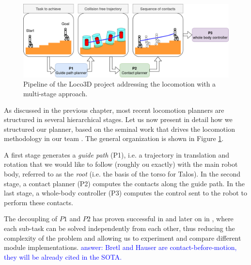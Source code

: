\begin{figure}
    \centering
    \includegraphics[width=\textwidth]{Figures/Chapter_LEAS/pipeline.png}
    \caption{Pipeline of the Loco3D project addressing the locomotion with a multi-stage approach.}
    \label{fig:pipeline}
\end{figure}


As discussed in the previous chapter, most recent locomotion planners are structured in several hierarchical stages. Let us now present in detail how we structured our planner, based on the seminal work that drives the locomotion methodology in our team \cite{loco3d}.
The general organization is shown in Figure \ref{fig:pipeline}.

A first stage generates a \textit{guide path} (P1), i.e. a trajectory in translation and rotation that we would like to follow (roughly ou exactly) with the main robot body, referred to as the \textit{root} (i.e. the basis of the torso for Talos). In the second stage, a contact planner (P2) computes the contacts along the guide path. In the last stage, a whole-body controller (P3) computes the control sent to the robot to perform these contacts.

The decoupling of $P1$ and $P2$ has proven successful in \cite{Escande2008Guide, bouyarmane2009} and later on in \cite{loco3d, RB-PRM}, where each sub-task can be solved independently from each other, thus reducing the complexity of the problem and allowing us to experiment and compare different module implementations. 
\textcolor{blue}{answer: Bretl and Hauser are contact-before-motion, they will be already cited in the SOTA.}

